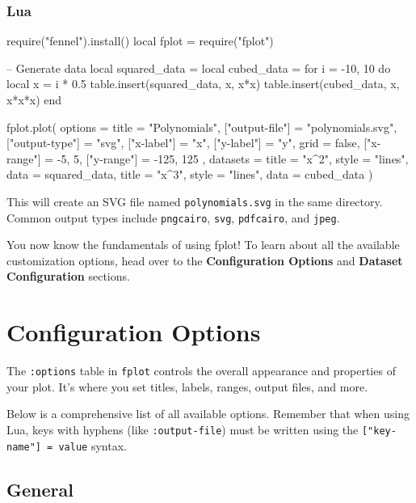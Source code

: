 \documentclass[12pt, letterpaper]{article}
\begin{document}
	\subsubsection*{Lua}
	
	\begin{luacode}
require("fennel").install()
local fplot = require("fplot")

-- Generate data
local squared_data = {}
local cubed_data = {}
for i = -10, 10 do
local x = i * 0.5
table.insert(squared_data, {x, x*x})
table.insert(cubed_data, {x, x*x*x})
end

fplot.plot({
	options = {
		title = "Polynomials",
		["output-file"] = "polynomials.svg",
		["output-type"] = "svg",
		["x-label"] = "x",
		["y-label"] = "y",
		grid = false,
		["x-range"] = {-5, 5},
		["y-range"] = {-125, 125}
	},
	datasets = {
		{title = "x^2", style = "lines", data = squared_data},
		{title = "x^3", style = "lines", data = cubed_data}
	}
})
	\end{luacode}
	
	This will create an SVG file named \texttt{polynomials.svg} in the same directory. Common output types include \texttt{pngcairo}, \texttt{svg}, \texttt{pdfcairo}, and \texttt{jpeg}.
	
	You now know the fundamentals of using fplot! To learn about all the available customization options, head over to the \textbf{Configuration Options} and \textbf{Dataset Configuration} sections.
	
	\newpage
	
	\section{Configuration Options}
	
	The \texttt{:options} table in \texttt{fplot} controls the overall appearance and properties of your plot. It's where you set titles, labels, ranges, output files, and more.
	
	Below is a comprehensive list of all available options. Remember that when using Lua, keys with hyphens (like \texttt{:output-file}) must be written using the \texttt{["key-name"] = value} syntax.
	
	\subsection{General}
	
\end{document}
